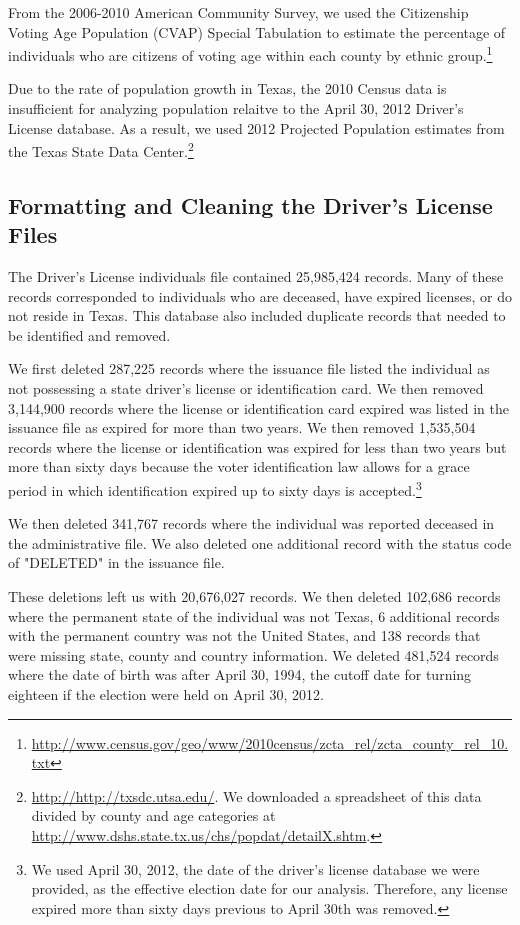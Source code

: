 \documentclass[12pt]{article}
\begin{document}
From the 2006-2010 American Community Survey, we used the Citizenship Voting Age Population (CVAP) Special Tabulation to estimate the percentage of individuals who are citizens of voting age within each county by ethnic group.\footnote{\url{http://www.census.gov/geo/www/2010census/zcta_rel/zcta_county_rel_10.txt}}

Due to the rate of population growth in Texas, the 2010 Census data is
insufficient for analyzing population relaitve to the April 30, 2012
Driver's License database.  As a result, we used 2012 Projected
Population estimates from the Texas State Data
Center.\footnote{\url{http://http://txsdc.utsa.edu/}.  We downloaded a
  spreadsheet of this data divided by county and age categories at
  \url{http://www.dshs.state.tx.us/chs/popdat/detailX.shtm}.}

\subsection{Formatting and Cleaning the Driver's License Files}
The Driver's License individuals file contained 25,985,424 records.
Many of these records corresponded to individuals who are deceased,
have expired licenses, or do not reside in Texas.  This database also
included duplicate records that needed to be identified and removed.

We first deleted 287,225 records where the issuance file listed the
individual as not possessing a state driver's license or
identification card.  We then removed 3,144,900 records where the
license or identification card expired was listed in the issuance file
as expired for more than two years.  We then removed 1,535,504 records
where the license or identification was expired for less than two
years but more than sixty days because the voter identification law
allows for a grace period in which identification expired up to sixty
days is accepted.\footnote{We used April 30, 2012, the date of the
  driver's license database we were provided, as the effective election
  date for our analysis.  Therefore, any license expired more than
  sixty days previous to April 30th was removed.}

We then deleted 341,767 records where the individual was reported
deceased in the administrative file.  We also deleted one additional
record with the status code of "DELETED" in the issuance file. 

These deletions left us with 20,676,027 records.  We then deleted
102,686 records where the permanent state of the individual was not
Texas, 6 additional records with the permanent country was not the
United States, and 138 records that were missing state, county and
country information.  We deleted 481,524 records where the date of
birth was after April 30, 1994, the cutoff date for turning eighteen
if the election were held on April 30, 2012.
\end{document}
